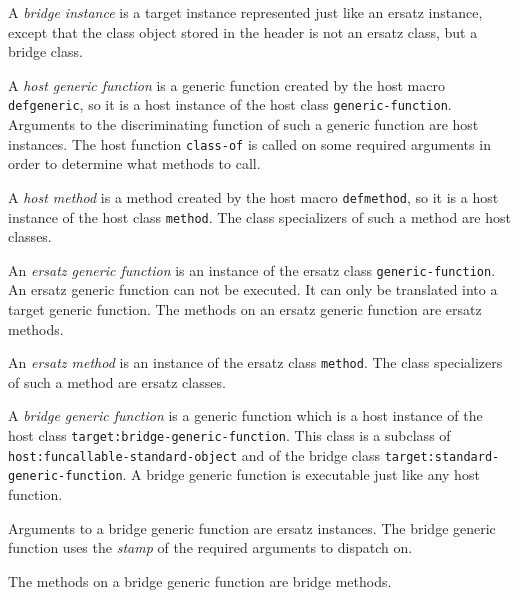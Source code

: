 \begin{definition}
A \emph{bridge instance} is a target instance represented just like an
ersatz instance, except that the class object stored in the header is
not an ersatz class, but a bridge class. 
\end{definition}

\begin{definition}
A \emph{host generic function} is a generic function created by the
host macro \texttt{defgeneric}, so it is a host instance of the host
class \texttt{generic-function}.  Arguments to the discriminating
function of such a generic function are host instances.  The host
function \texttt{class-of} is called on some required arguments in
order to determine what methods to call.
\end{definition}

\begin{definition}
A \emph{host method} is a method created by the host macro
\texttt{defmethod}, so it is a host instance of the host class
\texttt{method}.  The class specializers of such a method are host
classes.
\end{definition}

\begin{definition}
An \emph{ersatz generic function} is an instance of the ersatz class
\texttt{generic-function}.  An ersatz generic function can not be
executed.  It can only be translated into a target generic function.
The methods on an ersatz generic function are ersatz methods.
\end{definition}

\begin{definition}
An \emph{ersatz method} is an instance of the ersatz class
\texttt{method}.  The class specializers of such a method are ersatz
classes.
\end{definition}

\begin{definition}
A \emph{bridge generic function} is a generic function which is a host
instance of the host class \texttt{target:bridge-generic-function}.
This class is a subclass of \texttt{host:funcallable-standard-object}
and of the bridge class \texttt{target:standard-generic-function}.
A bridge generic function is executable just like any host function.

Arguments to a bridge generic function are ersatz instances.  The
bridge generic function uses the 
\emph{stamp}
 of
the required arguments to dispatch on. 

The methods on a bridge generic function are bridge methods.
\end{definition}

